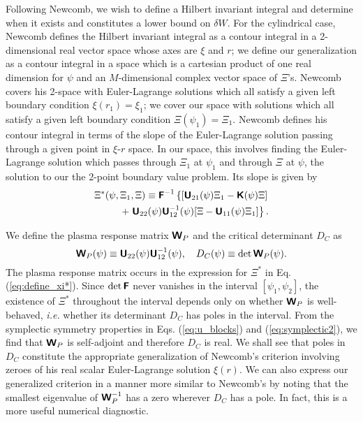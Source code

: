 \documentclass[prb,twocolumn,showpacs,preprintnumbers,amsmath,amssymb]{revtex4}
\renewcommand*{\t}[1]{\hbox{\sffamily\bfseries #1}}
\begin{document}
Following Newcomb, we wish to define a Hilbert invariant integral and
determine when it exists and constitutes a lower bound on $\delta W$.
For the cylindrical case, Newcomb defines the Hilbert invariant integral
as a contour integral in a 2-dimensional real vector space whose axes
are $\xi$ and $r$; we define our generalization as a contour integral in
a space which is a cartesian product of one real dimension for $\psi$
and an $M$-dimensional complex vector space of $\Xi$'s.  Newcomb covers
his 2-space with Euler-Lagrange solutions which all satisfy a given left
boundary condition $\xi(r_1) = \xi_1$; we cover our space with solutions
which all satisfy a given left boundary condition $\Xi(\psi_1) = \Xi_1$.
Newcomb defines his contour integral in terms of the slope of the
Euler-Lagrange solution passing through a given point in $\xi$-$r$
space.  In our space, this involves finding the Euler-Lagrange solution
which passes through $\Xi_1$ at $\psi_1$ and through $\Xi$ at $\psi$,
the solution to our the 2-point boundary value problem.  Its slope is
given by
\begin{eqnarray}
\Xi^*(\psi,\Xi_1,\Xi) \equiv \t{F}^{-1} \left\{ 
	[\t{U}_{21}(\psi) \Xi_1 - \t{K}(\psi)\Xi] \right. \nonumber \\
+\left. \t{U}_{22}(\psi) \t{U}_{12}^{-1}(\psi) 
	[\Xi - \t{U}_{11}(\psi) \Xi_1] \right\}.
\label{eq:define_xi*}
\end{eqnarray}

We define the plasma response matrix $\t{W}_P$ and the critical
determinant $D_C$ as
\begin{equation}
\t{W}_P(\psi) \equiv \t{U}_{22}(\psi) \t{U}_{12}^{-1}(\psi), \quad
D_C(\psi) \equiv \det \t{W}_P(\psi).
\label{eq:define_dc}
\end{equation}
The plasma response matrix occurs in the expression for $\Xi^*$ in
Eq. (\ref{eq:define_xi*}).  Since $\det \t{F}$ never vanishes in the
interval $[\psi_1,\psi_2]$, the existence of $\Xi^*$ throughout the
interval depends only on whether $\t{W}_P$ is well-behaved, {\it i.e.}
whether its determinant $D_C$ has poles in the interval.  From the
symplectic symmetry properties in Eqs. (\ref{eq:u_blocks}) and
(\ref{eq:symplectic2}), we find that $\t{W}_P$ is self-adjoint and
therefore $D_C$ is real.  We shall see that poles in $D_C$ constitute
the appropriate generalization of Newcomb's criterion involving zeroes
of his real scalar Euler-Lagrange solution $\xi(r)$.  We can also
express our generalized criterion in a manner more similar to Newcomb's
by noting that the smallest eigenvalue of $\t{W}_P^{-1}$ has a zero
wherever $D_C$ has a pole.  In fact, this is a more useful numerical
diagnostic.
\end{document}
